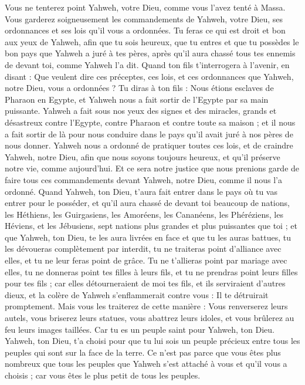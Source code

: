 \begin{multicols}{2}
Vous ne tenterez point Yahweh, votre Dieu, comme vous l'avez tenté à Massa.
Vous garderez soigneusement les commandements de Yahweh, votre Dieu, ses ordonnances et ses lois qu'il vous a ordonnées.
Tu feras ce qui est droit et bon aux yeux de Yahweh, afin que tu sois heureux, que tu entres et que tu possèdes le bon pays que Yahweh a juré à tes pères,
après qu’il aura chassé tous tes ennemis de devant toi, comme Yahweh l’a dit.
Quand ton fils t'interrogera à l’avenir, en disant : Que veulent dire ces préceptes, ces lois, et ces ordonnances que Yahweh, notre Dieu, vous a ordonnées ?
Tu diras à ton fils : Nous étions esclaves de Pharaon en Egypte, et Yahweh nous a fait sortir de l'Egypte par sa main puissante.
Yahweh a fait sous nos yeux des signes et des miracles, grands et désastreux contre l’Egypte, contre Pharaon et contre toute sa maison ;
et il nous a fait sortir de là pour nous conduire dans le pays qu’il avait juré à nos pères de nous donner.
Yahweh nous a ordonné de pratiquer toutes ces lois, et de craindre Yahweh, notre Dieu, afin que nous soyons toujours heureux, et qu’il préserve notre vie, comme aujourd'hui.
Et ce sera notre justice que nous prenions garde de faire tous ces commandements devant Yahweh, notre Dieu, comme il nous l'a ordonné.
\VerseOne{}Quand Yahweh, ton Dieu, t'aura fait entrer dans le pays où tu vas entrer pour le posséder, et qu'il aura chassé de devant toi beaucoup de nations, les Héthiens, les Guirgasiens, les Amoréens, les Cananéens, les Phéréziens, les Héviens, et les Jébusiens, sept nations plus grandes et plus puissantes que toi ;
et que Yahweh, ton Dieu, te les aura livrées en face et que tu les auras battues, tu les dévoueras complètement par interdit, tu ne traiteras point d’alliance avec elles, et tu ne leur feras point de grâce.
Tu ne t'allieras point par mariage avec elles, tu ne donneras point tes filles à leurs fils, et tu ne prendras point leurs filles pour tes fils ;
car elles détourneraient de moi tes fils, et ils serviraient d'autres dieux, et la colère de Yahweh s'enflammerait contre vous : Il te détruirait promptement.
Mais vous les traiterez de cette manière : Vous renverserez leurs autels, vous briserez leurs statues, vous abattrez leurs idoles\FTNT{}, et vous brûlerez au feu leurs images taillées.
Car tu es un peuple saint pour Yahweh, ton Dieu. Yahweh, ton Dieu, t'a choisi pour que tu lui sois un peuple précieux entre tous les peuples qui sont sur la face de la terre.
Ce n'est pas parce que vous êtes plus nombreux que tous les peuples que Yahweh s’est attaché à vous et qu’il vous a choisis ; car vous êtes le plus petit de tous les peuples.

\end{multicols}
